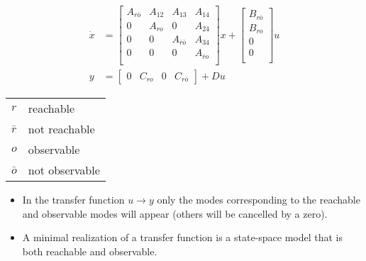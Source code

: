 \begin{align*}
    \dot{x} & = \begin{bmatrix}
                    A_{r\bar{o}} & A_{12} & A_{13}             & A_{14}       \\
                    0            & A_{ro} & 0                  & A_{24}       \\
                    0            & 0      & A_{\bar{r}\bar{o}} & A_{34}       \\
                    0            & 0      & 0                  & A_{\bar{r}o} \\
                \end{bmatrix}
    x + \begin{bmatrix}
            B_{r\bar{o}} \\
            B_{ro}       \\
            0            \\
            0            \\
        \end{bmatrix}
    u                                                                                                      \\
    y       & = \begin{bmatrix}
                    0 & C_{ro} & 0 & C_{r\bar{o}}
                \end{bmatrix}
    + Du
\end{align*}

\newpar{}

\begin{tabularx}{\linewidth}{@{}ll@{}}
    $r$       & reachable      \\
    $\bar{r}$ & not reachable  \\
    $o$       & observable     \\
    $\bar{o}$ & not observable \\
\end{tabularx}

\begin{itemize}
    \item In the transfer function $u \rightarrow y$ only the modes corresponding to the reachable and observable modes will appear (others will be cancelled by a zero).
    \item A minimal realization of a transfer function is a state-space model that is both reachable and observable.
\end{itemize}